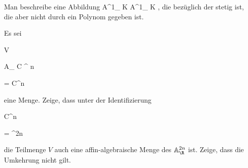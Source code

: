 {} {}




{}


{


Man beschreibe eine Abbildung
\maabbdisp {\varphi} { {\mathbb A}^{1}_{ K } } { {\mathbb A}^{1}_{ K }
} {,}
die bezüglich der
 stetig ist, die aber nicht durch ein Polynom gegeben ist.


}


{} {}




{}


{


Es sei


\mavergleichskettedisp


{\vergleichskette


{V
}


{ \subseteq} { { {\mathbb A}_{  {\mathbb C} }^{  n   } }
}


{ =} { {\mathbb C}^n
}


{ } {
}


{ } {
}


}
{}{}{}
eine
Menge. Zeige, dass unter der Identifizierung


\mavergleichskettedisp


{\vergleichskette


{ {\mathbb C}^n
}


{ =} { \R^{2n}
}


{ } {
}


{ } {
}


{ } {
}


}
{}{}{}
die Teilmenge $V$ auch eine affin-algebraische Menge des ${ {\mathbb A}_{ \R }^{  2n  } }$ ist. Zeige, dass die Umkehrung nicht gilt.


}


{} {}




{}


